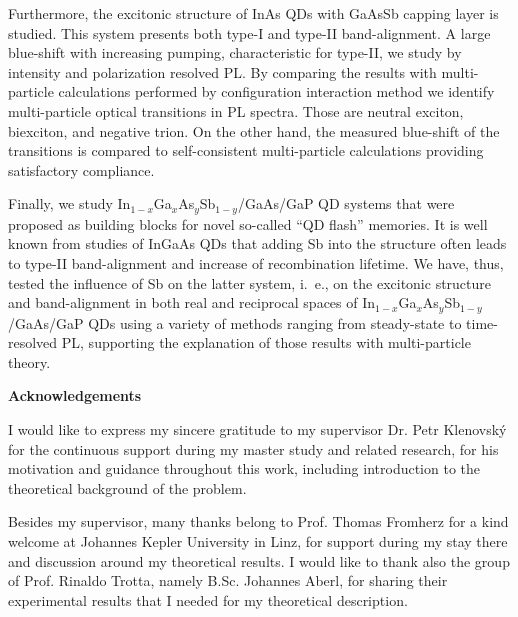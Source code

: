 \documentclass[
a4paper, %
11pt, %
onecolumn, %
openany, %
oldfontcommands,
]{memoir}
\begin{document}
Furthermore, the excitonic structure of InAs QDs with GaAsSb capping layer is studied. This system presents both type-I and type-II band-alignment. A large blue-shift with increasing pumping, characteristic for type-II, we study by intensity and polarization resolved PL. By comparing the results with multi-particle calculations performed by configuration interaction method we identify multi-particle optical transitions in PL spectra. Those are neutral exciton, biexciton, and negative trion. On the other hand, the measured blue-shift of the transitions is compared to self-consistent multi-particle calculations providing satisfactory compliance.

%
Finally, we study In$_{1-x}$Ga$_x$As$_y$Sb$_{1-y}$/GaAs/GaP QD systems that were proposed as building blocks for novel so-called \enquote{QD flash} memories.
It is well known from studies of InGaAs QDs that adding Sb into the structure often leads to type-II band-alignment and increase of recombination lifetime. We have, thus, tested the influence of Sb on the latter system, i.~e., on the excitonic structure and band-alignment in both real and reciprocal spaces of In$_{1-x}$Ga$_x$As$_y$Sb$_{1-y}$/GaAs/GaP QDs using a variety of methods ranging from steady-state to time-resolved PL, supporting the explanation of those results with multi-particle theory.
\newpage
%
\cleardoublepage

\newpage


\cleardoublepage
\noindent\Large\textbf{Acknowledgements}\\ \normalsize

\noindent I would like to express my sincere gratitude to my supervisor Dr. Petr Klenovský for the continuous support during my master study and related research, for his motivation and guidance throughout this work, including introduction to the theoretical background of the problem.

Besides my supervisor, many thanks belong to Prof. Thomas Fromherz for a kind welcome at Johannes Kepler University in Linz, for support during my stay there and discussion around my theoretical results. I would like to thank also the group of Prof. Rinaldo Trotta, namely B.Sc. Johannes Aberl, for sharing their experimental results that I needed for my theoretical description.
\end{document}
